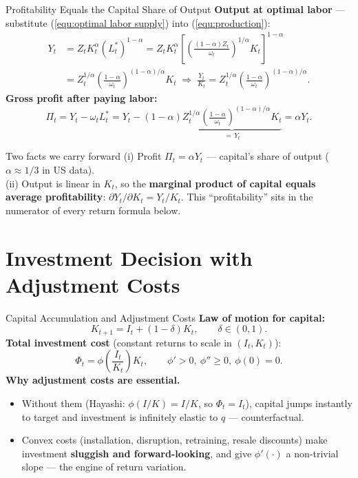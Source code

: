 \documentclass{beamer}
\begin{document}
\begin{frame}{Profitability Equals the Capital Share of Output}
	\textbf{Output at optimal labor} --- substitute (\ref{equ:optimal labor supply}) into (\ref{equ:production}):
	\begin{equation*}
		\begin{aligned}
			Y_t &= Z_t K_t^\alpha (L_t^*)^{1-\alpha}
			= Z_t K_t^\alpha\left[\left(\tfrac{(1-\alpha)Z_t}{\omega_t}\right)^{1/\alpha}K_t\right]^{1-\alpha}\\
			&= Z_t^{1/\alpha}\left(\frac{1-\alpha}{\omega_t}\right)^{(1-\alpha)/\alpha}K_t
			\;\Rightarrow\; \frac{Y_t}{K_t}=Z_t^{1/\alpha}\left(\frac{1-\alpha}{\omega_t}\right)^{(1-\alpha)/\alpha}.
		\end{aligned}
	\end{equation*}
	\textbf{Gross profit after paying labor:}
	\begin{equation}\label{equ: gross profit}
		\Pi_t=Y_t-\omega_t L_t^* = Y_t-(1-\alpha)\underbrace{Z_t^{1/\alpha}\!\left(\tfrac{1-\alpha}{\omega_t}\right)^{(1-\alpha)/\alpha}K_t}_{=\,Y_t}=\alpha Y_t.
	\end{equation}
	\begin{block}{Two facts we carry forward}
		(i) Profit $\Pi_t=\alpha Y_t$ --- capital's share of output ($\alpha\approx 1/3$ in US data). \\
		(ii) Output is linear in $K_t$, so the \textbf{marginal product of capital equals average profitability}: $\partial Y_t/\partial K_t = Y_t/K_t$. This ``profitability'' sits in the numerator of every return formula below.
	\end{block}
\end{frame}

\section{Investment Decision with Adjustment Costs}

\begin{frame}{Capital Accumulation and Adjustment Costs}
	\textbf{Law of motion for capital:}
	\begin{equation}\label{equ:capital accumulation}
		K_{t+1}=I_t+(1-\delta)K_t,\qquad \delta\in(0,1).
	\end{equation}
	\textbf{Total investment cost} (constant returns to scale in $(I_t,K_t)$):
	\begin{equation}\label{equ:investment cost}
		\Phi_t=\phi\!\left(\frac{I_t}{K_t}\right)K_t,\qquad \phi'>0,\ \phi''\ge 0,\ \phi(0)=0.
	\end{equation}
	\textbf{Why adjustment costs are essential.}
	\begin{itemize}
		\item Without them (Hayashi: $\phi(I/K)=I/K$, so $\Phi_t=I_t$), capital jumps instantly to target and investment is infinitely elastic to $q$ --- counterfactual.
		\item Convex costs (installation, disruption, retraining, resale discounts) make investment \textbf{sluggish and forward-looking}, and give $\phi'(\cdot)$ a non-trivial slope --- the engine of return variation.
	\end{itemize}
\end{frame}
\end{document}
